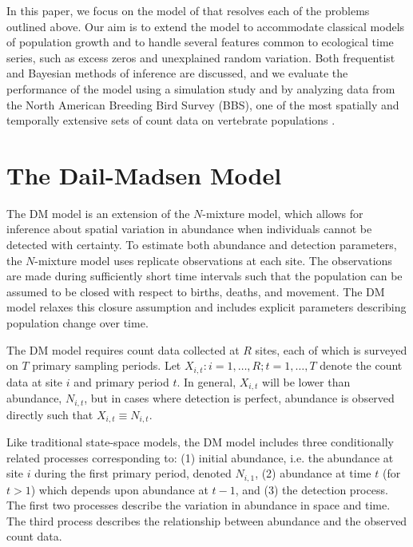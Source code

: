 \documentclass[12pt,english]{article}
\begin{document}
\begin{spacing}{1.9}
\begin{flushleft}
In this paper, we focus on the model of \citet[henceforth the DM model]{dail_madsen:2011}
that resolves each of the problems outlined above. 
Our aim is to extend the
model to accommodate classical models of population growth and
to handle several features common to ecological
time series, such as excess zeros and unexplained random variation. 
Both frequentist and Bayesian methods of inference are discussed, and
we evaluate the performance of the model using a simulation study and by
analyzing data from the North American Breeding Bird Survey (BBS), one of
the most spatially and temporally extensive sets of count data on
vertebrate populations \citep{robbins_etal:1986}.

\section*{The Dail-Madsen Model}
\label{sec:dm}

The DM model is an extension of the 
\citet{royle:2004biom} $N$-mixture model, which allows for inference about spatial
variation in abundance when individuals cannot be detected with
certainty. To estimate both abundance and detection parameters, 
the $N$-mixture model uses replicate %
observations at each site. The observations are made during sufficiently
short time intervals such that the population can be %
assumed to be closed with respect to births, deaths, and movement. The DM
model relaxes this closure assumption and includes explicit parameters
describing population change over time.

The DM model requires count data collected at $R$ sites, each of
which is surveyed on $T$ primary sampling periods. 
Let $X_{i,t}: i=1,\hdots,R; t=1,\hdots,T$ denote the count data
at site $i$ and primary period $t$. 
In general, $X_{i,t}$ will be lower than abundance, 
$N_{i,t}$, but in cases where detection is perfect,
abundance is observed directly such that $X_{i,t} \equiv N_{i,t}$.

Like traditional state-space models, the DM model includes 
three conditionally related processes corresponding to: 
(1) initial abundance, i.e. the
abundance at site $i$ during the first primary period,
denoted $N_{i,1}$, (2) abundance at time $t$ (for $t>1$) which depends upon
abundance at $t-1$, and (3) the
detection process. %
The first two processes describe the %
variation in abundance in space and time. The third process 
describes the relationship between
abundance and the observed count data.


\end{flushleft}
\end{spacing}
\end{document}
